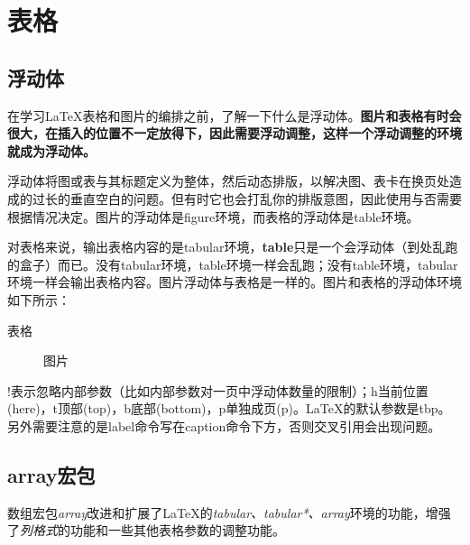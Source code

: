{\let\clearpage\relax \chapter{表格}}

\section{浮动体}

在学习\LaTeX{}表格和图片的编排之前，了解一下什么是浮动体。\textbf{图片和表格有时会很大，在插入的位置不一定放得下，因此需要浮动调整，这样一个浮动调整的环境就成为浮动体。}


浮动体将图或表与其标题定义为整体，然后动态排版，以解决图、表卡在换页处造成的过长的垂直空白的问题。但有时它也会打乱你的排版意图，因此使用与否需要根据情况决定。图片的浮动体是figure环境，而表格的浮动体是table环境。

对表格来说，输出表格内容的是tabular环境，\textbf{table}只是一个会浮动体（到处乱跑的盒子）而已。没有tabular环境，table环境一样会乱跑；没有table环境，tabular环境一样会输出表格内容。图片浮动体与表格是一样的。图片和表格的浮动体环境如下所示：

\begin{latex}
\begin{table}[!htbp]
表格
\end{table}
\begin{figure}[!htbp]
图片
\end{figure}
\end{latex}

!表示忽略内部参数（比如内部参数对一页中浮动体数量的限制）；h当前位置(here)，t顶部(top)，b底部(bottom)，p单独成页(p)。\LaTeX{}的默认参数是tbp。另外需要注意的是label命令写在caption命令下方，否则交叉引用会出现问题。

\section{array宏包}

数组宏包\emph{array}改进和扩展了\LaTeX 的\emph{tabular、tabular*、array}环境的功能，增强了\emph{列格式}的功能和一些其他表格参数的调整功能。

